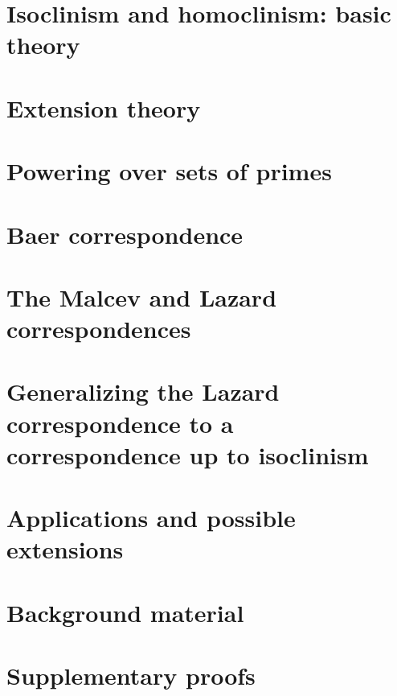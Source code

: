 \documentclass{ucetd}
\begin{document}


\chapter{Isoclinism and homoclinism: basic theory}



\chapter{Extension theory}



\chapter{Powering over sets of primes}



\chapter{Baer correspondence}



\chapter{The Malcev and Lazard correspondences}



\chapter{Generalizing the Lazard correspondence to a correspondence up to isoclinism}



\chapter{Applications and possible extensions}



\newpage

\begin{appendices}

\appendixpage
\addappheadtotoc

\chapter{Background material}



\chapter{Supplementary proofs}



\end{appendices}
\makebibliography
\end{document}
